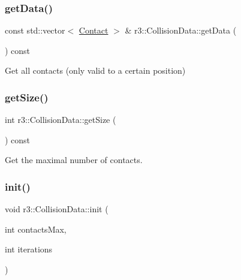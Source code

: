 \mbox{\label{classr3_1_1_collision_data_ab31745ebb708c1d04e22bcfb385e663f}} 
\subsubsection{\texorpdfstring{get\+Data()}{getData()}\hspace{0.1cm}{\footnotesize\ttfamily [2/2]}}
{\footnotesize\ttfamily const std\+::vector$<$ \mbox{\hyperlink{classr3_1_1_contact}{Contact}} $>$ \& r3\+::\+Collision\+Data\+::get\+Data (\begin{DoxyParamCaption}{ }\end{DoxyParamCaption}) const}



Get all contacts (only valid to a certain position) 

\mbox{\label{classr3_1_1_collision_data_ad0898e21e34b4558dbdd68dd115c49d8}} 
\subsubsection{\texorpdfstring{get\+Size()}{getSize()}}
{\footnotesize\ttfamily int r3\+::\+Collision\+Data\+::get\+Size (\begin{DoxyParamCaption}{ }\end{DoxyParamCaption}) const}



Get the maximal number of contacts. 

\mbox{\label{classr3_1_1_collision_data_a2af69fd6da492254b1a134d4ef82efce}} 
\subsubsection{\texorpdfstring{init()}{init()}}
{\footnotesize\ttfamily void r3\+::\+Collision\+Data\+::init (\begin{DoxyParamCaption}\item[{int}]{contacts\+Max,  }\item[{int}]{iterations }\end{DoxyParamCaption})}

